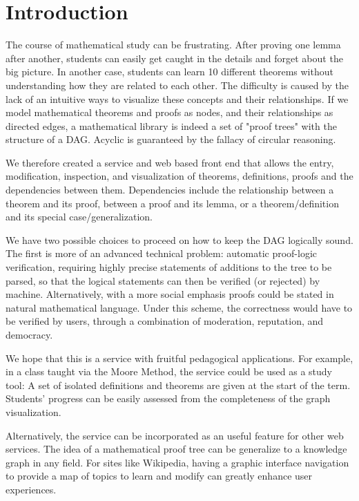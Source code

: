\documentclass{acm_proc_article-sp}
\begin{document}

\section{Introduction}
The course of mathematical study can be frustrating. After proving one lemma after another, students can easily get caught in the details and forget about the big picture. In another case, students can learn 10 different theorems without understanding how they are related to each other.  The difficulty is caused by the lack of an intuitive ways to visualize these concepts and their relationships. If we model mathematical theorems and proofs as nodes, and their relationships as directed edges, a mathematical library is indeed a set of "proof trees" with the structure of a DAG. Acyclic is guaranteed by the fallacy of circular reasoning. 
 
We therefore created a service and web based front end that allows the entry, modification, inspection, and visualization of theorems, definitions, proofs and the dependencies between them. Dependencies include the relationship between a theorem and its proof, between a proof and its lemma, or a theorem/definition and its special case/generalization.

We have two possible choices to proceed on how to keep the DAG logically sound. The first is more of an advanced technical problem: automatic proof-logic verification, requiring highly precise statements of additions to the tree to be parsed, so that the logical statements can then be verified (or rejected) by machine. Alternatively, with a more social emphasis proofs could be stated in natural mathematical language. Under this scheme, the correctness would have to be verified by users, through a combination of moderation, reputation, and democracy.

We hope that this is a service with fruitful pedagogical applications. For example, in a class taught via the Moore Method, the service could be used as a study tool: A set of isolated definitions and theorems are given at the start of the term. Students' progress can be easily assessed from the completeness of the graph visualization. 

Alternatively, the service can be incorporated as an useful feature for other web services. The idea of a mathematical proof tree can be generalize to a knowledge graph in any field.  For sites like Wikipedia, having a graphic interface navigation to provide a map of topics to learn and modify can greatly enhance user experiences.
\end{document}
